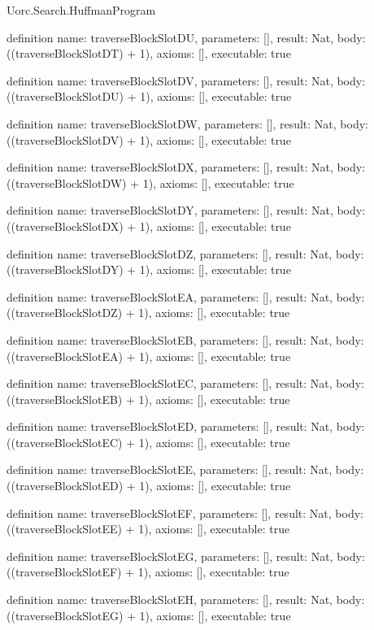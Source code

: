 \begin{lexlean}{Uorc.Search.HuffmanProgram}
\begin{semanticmodule}
definition{
  name: traverseBlockSlotDU,
  parameters: [],
  result: Nat,
  body: ((traverseBlockSlotDT) + 1),
  axioms: [],
  executable: true
}

definition{
  name: traverseBlockSlotDV,
  parameters: [],
  result: Nat,
  body: ((traverseBlockSlotDU) + 1),
  axioms: [],
  executable: true
}

definition{
  name: traverseBlockSlotDW,
  parameters: [],
  result: Nat,
  body: ((traverseBlockSlotDV) + 1),
  axioms: [],
  executable: true
}

definition{
  name: traverseBlockSlotDX,
  parameters: [],
  result: Nat,
  body: ((traverseBlockSlotDW) + 1),
  axioms: [],
  executable: true
}

definition{
  name: traverseBlockSlotDY,
  parameters: [],
  result: Nat,
  body: ((traverseBlockSlotDX) + 1),
  axioms: [],
  executable: true
}

definition{
  name: traverseBlockSlotDZ,
  parameters: [],
  result: Nat,
  body: ((traverseBlockSlotDY) + 1),
  axioms: [],
  executable: true
}

definition{
  name: traverseBlockSlotEA,
  parameters: [],
  result: Nat,
  body: ((traverseBlockSlotDZ) + 1),
  axioms: [],
  executable: true
}

definition{
  name: traverseBlockSlotEB,
  parameters: [],
  result: Nat,
  body: ((traverseBlockSlotEA) + 1),
  axioms: [],
  executable: true
}

definition{
  name: traverseBlockSlotEC,
  parameters: [],
  result: Nat,
  body: ((traverseBlockSlotEB) + 1),
  axioms: [],
  executable: true
}

definition{
  name: traverseBlockSlotED,
  parameters: [],
  result: Nat,
  body: ((traverseBlockSlotEC) + 1),
  axioms: [],
  executable: true
}

definition{
  name: traverseBlockSlotEE,
  parameters: [],
  result: Nat,
  body: ((traverseBlockSlotED) + 1),
  axioms: [],
  executable: true
}

definition{
  name: traverseBlockSlotEF,
  parameters: [],
  result: Nat,
  body: ((traverseBlockSlotEE) + 1),
  axioms: [],
  executable: true
}

definition{
  name: traverseBlockSlotEG,
  parameters: [],
  result: Nat,
  body: ((traverseBlockSlotEF) + 1),
  axioms: [],
  executable: true
}

definition{
  name: traverseBlockSlotEH,
  parameters: [],
  result: Nat,
  body: ((traverseBlockSlotEG) + 1),
  axioms: [],
  executable: true
}


\end{semanticmodule}
\end{lexlean}
